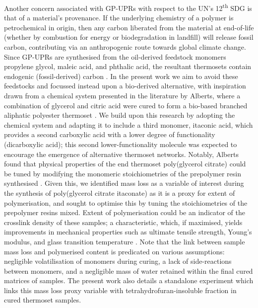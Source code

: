 Another concern associated with GP-UPRs with respect to the UN's
 12\textsuperscript{th} SDG is that of a material's provenance.
If the underlying chemistry of a polymer is petrochemical in origin, then
 any carbon liberated from the material at end-of-life (whether by combustion
 for energy or biodegradation in landfill) will release fossil carbon,
 contributing via an anthropogenic route towards global climate change.
Since GP-UPRs are synthesised from the oil-derived
 feedstock monomers propylene glycol, maleic acid, and phthalic acid, the
 resultant thermosets contain endogenic (fossil-derived) carbon
 \autocite{Levi2018}.
In the present work we aim to avoid these feedstocks and focussed instead
 upon a bio-derived alternative, with inspiration drawn from a chemical 
 system presented in the literature by Alberts, where a combination of 
 glycerol and citric acid were cured to form a bio-based branched 
 aliphatic polyester thermoset \autocite{Alberts2017}.
We build upon this research by adopting the chemical system and adapting it
 to include a third monomer, itaconic acid, which provides a second
 carboxylic acid with a lower degree of functionality (dicarboxylic acid);
 this second lower-functionality molecule was expected to
 encourage the emergence of alternative thermoset networks.
Notably, Alberts found that physical properties of the end thermoset
 poly(glycerol citrate) could be tuned by modifying the monomeric
 stoichiometries of the prepolymer resin synthesised \autocite{Alberts2017}.
Given this, we identified mass loss as a variable of interest during the
 synthesis of poly(glycerol citrate itaconate) as it is a proxy for
 extent of polymerisation, and sought to optimise this by 
 tuning the stoichiometries of the prepolymer resins mixed.
Extent of polymerisation could be an indicator of the crosslink density of 
 these samples; a characteristic, which, if maximised, yields improvements
 in mechanical properties such as ultimate tensile strength, Young's modulus,
 and glass transition temperature \autocite{Panic2017}.
Note that the link between sample mass loss and polymerised content is
 predicated on various assumptions: negligible volatilisation of monomers
 during curing, a lack of side-reactions between monomers, and a negligible
 mass of water retained within the final cured matrices of samples.
The present work also details a standalone experiment 
 which links this mass loss proxy variable with tetrahydrofuran-insoluble
 fraction in cured thermoset samples.

